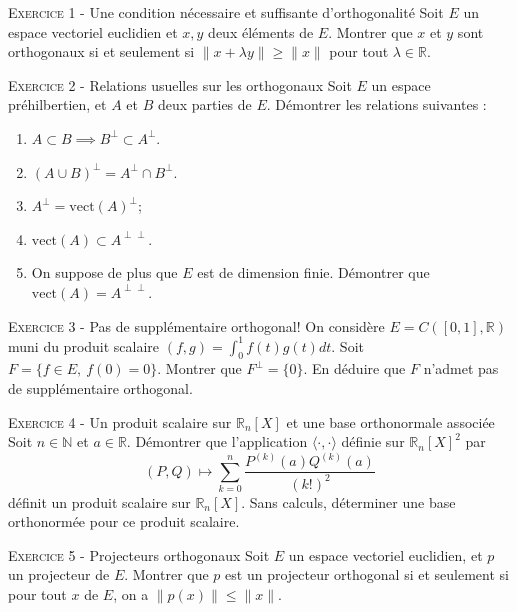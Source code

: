 \documentclass[11pt]{article}
\newcommand{\mtr}{\mathbb{R}}
\begin{document}
 

\begin{center}\textsc{{\huge }}\end{center}



\vskip0.3cm\noindent\textsc{Exercice 1} - Une condition nécessaire et suffisante d'orthogonalité
\vskip0.2cm
Soit $E$ un espace vectoriel euclidien et $x,y$ deux éléments de $E$. Montrer que $x$ et $y$ sont orthogonaux si et seulement si $\|x+\lambda y\|\geq \|x\|$ pour tout $\lambda\in\mathbb R$.




\vskip0.3cm\noindent\textsc{Exercice 2} - Relations usuelles sur les orthogonaux
\vskip0.2cm
Soit $E$ un espace préhilbertien, et $A$ et $B$ deux parties de $E$. Démontrer les relations suivantes :
\begin{enumerate}
\item $A\subset B\implies B^\perp\subset A^\perp$.
\item $(A\cup B)^\perp=A^\perp\cap B^\perp$.
\item $A^\perp=\textrm{vect}(A)^\perp$;
\item $\textrm{vect}(A)\subset A^{\perp\perp}$.
\item On suppose de plus que $E$ est de dimension finie. Démontrer que 
$\textrm{vect}(A)= A^{\perp\perp}$.
\end{enumerate}




\vskip0.3cm\noindent\textsc{Exercice 3} - Pas de supplémentaire orthogonal!
\vskip0.2cm
On considère $E=C([0,1],\mtr)$ muni du produit scalaire $(f,g)=\int_0^1 f(t)g(t)dt.$
Soit $F=\{f\in E,\ f(0)=0\}$. Montrer que $F^\perp=\{0\}$. En déduire que $F$ n'admet pas
de supplémentaire orthogonal.




\vskip0.3cm\noindent\textsc{Exercice 4} - Un produit scalaire sur $\mathbb R_n[X]$ et une base orthonormale associée
\vskip0.2cm
Soit $n\in\mathbb N$ et $a\in\mathbb R$. Démontrer que l'application $\langle \cdot,\cdot\rangle$ définie sur $\mathbb R_n[X]^2$ par 
$$(P,Q)\mapsto \sum_{k=0}^n \frac{P^{(k)}(a)Q^{(k)}(a)}{(k!)^2}$$
définit un produit scalaire sur $\mathbb R_n[X]$. Sans calculs, déterminer une base orthonormée pour ce produit scalaire.




\vskip0.3cm\noindent\textsc{Exercice 5} - Projecteurs orthogonaux
\vskip0.2cm
Soit $E$ un espace vectoriel euclidien, et $p$ un projecteur de $E$. Montrer que $p$ est un projecteur orthogonal
si et seulement si pour tout $x$ de $E$, on a $\|p(x)\|\leq \|x\|$.
\end{document}

